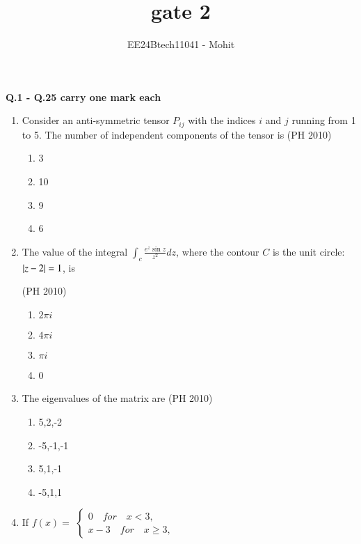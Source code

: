 \documentclass[journal,12pt,onecolumn]{IEEEtran}
\theoremstyle{remark}
\begin{document}
\title{gate 2}
\author{EE24Btech11041 - Mohit}
\maketitle
\renewcommand{\thefigure}{\theenumi}
\renewcommand{\thetable}{\theenumi}



\textbf{Q.1 - Q.25 carry one mark each}
\begin{enumerate}
\item Consider an anti-symmetric tensor $P_{ij}$ with the indices $i$ and $j$ running from 1 to 5. The number of independent components of the tensor is 
\hfill{(PH 2010)}
\begin{multicols}{4}
\begin{enumerate}
\item 3
\item 10
\item 9 
\item 6
\end{enumerate}
\end{multicols}
\item The value of the integral $\int_{c} \frac {e^z \sin{z}}{z^2}dz$, where the contour $C$ is the unit circle:
$\left\vert z-2\right\vert=1$, is

\hfill{(PH 2010)}
\begin{multicols}{4}
\begin{enumerate}
\item $2\pi i$
\item $4\pi i$
\item $\pi i$
\item 0
\end{enumerate}
\end{multicols}

\item The eigenvalues of the matrix 
are 
\hfill{(PH 2010)}
\begin{multicols}{4}
\begin{enumerate}
\item 5,2,-2
\item -5,-1,-1
\item 5,1,-1
\item -5,1,1
\end{enumerate}
\end{multicols}
\item If 
$f(x) =$ 
$\begin{cases} 
0 \quad for \quad x < 3, \\ 
x - 3 \quad for \quad x \geq 3, 
\end{cases}$


\end{enumerate}
\end{document}
